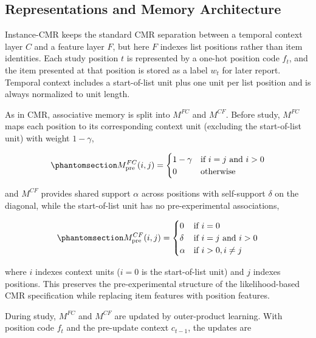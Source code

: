 \documentclass[
  man,
  floatsintext,
  longtable,
  nolmodern,
  notxfonts,
  notimes,
  draftfirst,
  colorlinks=true,linkcolor=blue,citecolor=blue,urlcolor=blue]{apa7}
\begin{document}
\subsection{Representations and Memory
Architecture}\label{representations-and-memory-architecture}

Instance-CMR keeps the standard CMR separation between a temporal
context layer \(C\) and a feature layer \(F\), but here \(F\) indexes
list positions rather than item identities. Each study position \(t\) is
represented by a one-hot position code \(f_t\), and the item presented
at that position is stored as a label \(w_t\) for later report. Temporal
context includes a start-of-list unit plus one unit per list position
and is always normalized to unit length.

As in CMR, associative memory is split into \(M^{FC}\) and \(M^{CF}\).
Before study, \(M^{FC}\) maps each position to its corresponding context
unit (excluding the start-of-list unit) with weight \(1-\gamma\),

\begin{equation}\phantomsection\label{eq-1}{
M^{FC}_{\text{pre}}(i,j) =
\begin{cases}
1-\gamma & \text{if } i=j \text{ and } i>0 \\
0 & \text{otherwise}
\end{cases}
}\end{equation}

and \(M^{CF}\) provides shared support \(\alpha\) across positions with
self-support \(\delta\) on the diagonal, while the start-of-list unit
has no pre-experimental associations,

\begin{equation}\phantomsection\label{eq-2}{
M^{CF}_{\text{pre}}(i,j) =
\begin{cases}
0 & \text{if } i=0 \\
\delta & \text{if } i=j \text{ and } i>0 \\
\alpha & \text{if } i>0, i\neq j
\end{cases}
}\end{equation}

where \(i\) indexes context units (\(i=0\) is the start-of-list unit)
and \(j\) indexes positions. This preserves the pre-experimental
structure of the likelihood-based CMR specification while replacing item
features with position features.

During study, \(M^{FC}\) and \(M^{CF}\) are updated by outer-product
learning. With position code \(f_t\) and the pre-update context
\(c_{t-1}\), the updates are
\end{document}
